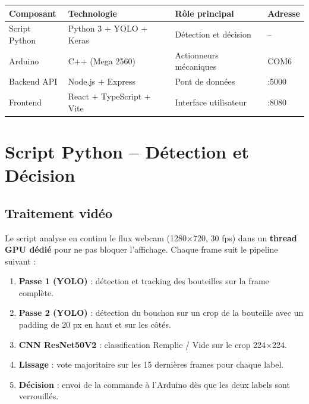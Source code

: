 \documentclass[11pt,a4paper]{article}
\begin{document}
\vspace{0.5em}
\begin{center}
\begin{tabular}{llll}
\toprule
\textbf{Composant} & \textbf{Technologie} & \textbf{Rôle principal} & \textbf{Adresse} \\
\midrule
Script Python  & Python 3 + YOLO + Keras & Détection et décision  & --      \\
Arduino        & C++ (Mega 2560)          & Actionneurs mécaniques & COM6    \\
Backend API    & Node.js + Express        & Pont de données        & :5000   \\
Frontend       & React + TypeScript + Vite& Interface utilisateur  & :8080   \\
\bottomrule
\end{tabular}
\end{center}

\section{Script Python -- Détection et Décision}

\subsection{Traitement vidéo}

Le script analyse en continu le flux webcam (1280$\times$720, 30 fps) dans un
\textbf{thread GPU dédié} pour ne pas bloquer l'affichage. Chaque frame suit le
pipeline suivant :

\begin{enumerate}[noitemsep]
  \item \textbf{Passe 1 (YOLO)} : détection et tracking des bouteilles sur la frame complète.
  \item \textbf{Passe 2 (YOLO)} : détection du bouchon sur un crop de la bouteille avec un
        padding de 20 px en haut et sur les côtés.
  \item \textbf{CNN ResNet50V2} : classification Remplie / Vide sur le crop 224$\times$224.
  \item \textbf{Lissage} : vote majoritaire sur les 15 dernières frames pour chaque label.
  \item \textbf{Décision} : envoi de la commande à l'Arduino dès que les deux labels sont verrouillés.
\end{enumerate}
\end{document}

